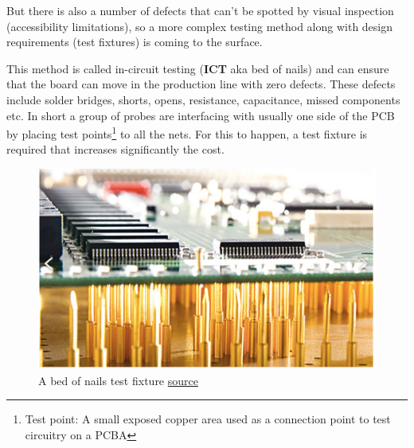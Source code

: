 \documentclass[final]{cubedoc}
\begin{document}
	But there is also a number of defects that can't be spotted by visual inspection (accessibility limitations), so a more complex testing method along with design requirements (test fixtures) is coming to the surface. 
	
	This method is called in-circuit testing (\textbf{ICT} aka bed of nails) and can ensure that the board can move in the production line with zero defects. These defects include solder bridges, shorts, opens, resistance, capacitance, missed components etc. In short a group of probes are interfacing with usually one side of the PCB  by placing test points\footnote{Test point: A small exposed copper area used as a connection point to test circuitry on a PCBA} to all the nets. For this to happen, a test fixture is required that increases significantly the cost.
	
	
	\begin{figure}[h!]
		\centering
		\includegraphics[keepaspectratio, width=\textwidth, height=.25\textheight]{assets/bed_of_nails.png}
		\caption{A bed of nails test fixture \href{https://hackaday.com/2019/02/09/test-pcbs-on-a-bed-of-nails/}{source}}
	\end{figure}
	
\end{document}

